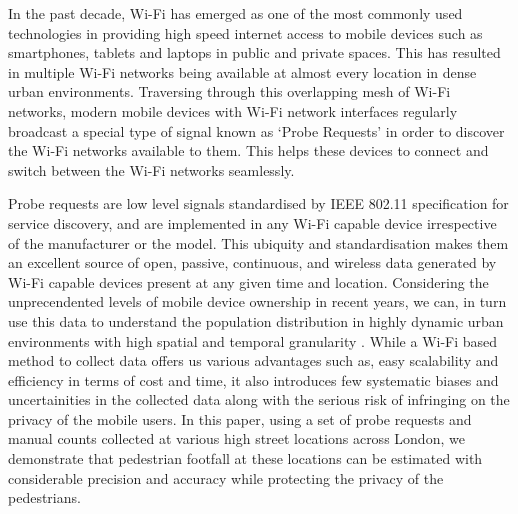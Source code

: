 In the past decade, Wi-Fi has emerged as one of the most commonly used
technologies in providing high speed internet access to mobile devices such as
smartphones, tablets and laptops in public and private spaces. This has
resulted in multiple Wi-Fi networks being available at almost every location in
dense urban environments. Traversing through this overlapping mesh of Wi-Fi
networks, modern mobile devices with Wi-Fi network interfaces regularly
broadcast a special type of signal known as `Probe Requests' in order to
discover the Wi-Fi networks available to them. This helps these devices to
connect and switch between the Wi-Fi networks seamlessly.

Probe requests are low level signals standardised by IEEE 802.11 specification
\citep{ieee2016} for service discovery, and are implemented in any Wi-Fi
capable device irrespective of the manufacturer or the model. This ubiquity and
standardisation makes them an excellent source of open, passive, continuous,
and wireless data generated by Wi-Fi capable devices present at any given time
and location. Considering the unprecendented levels of mobile device ownership
in recent years, we can, in turn use this data to understand the population
distribution in highly dynamic urban environments with high spatial and
temporal granularity \citep{freud2015, konto2017}. While a Wi-Fi based method to
collect data offers us various advantages such as, easy scalability and
efficiency in terms of cost and time, it also introduces few systematic biases
and uncertainities in the collected data along with the serious risk of
infringing on the privacy of the mobile users. In this paper, using a set of
probe requests and manual counts collected at various high street locations
across London, we demonstrate that pedestrian footfall at these locations can
be estimated with considerable precision and accuracy while protecting the
privacy of the pedestrians.

